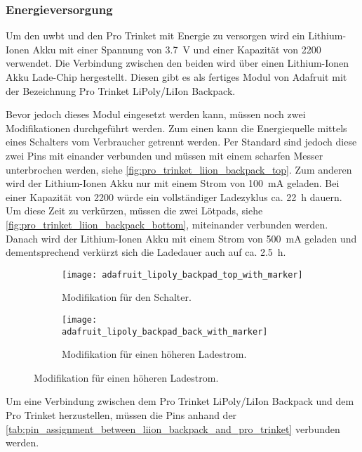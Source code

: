 \subsubsection{Energieversorgung}

Um den \Gls{uwbt} und den Pro Trinket mit Energie zu versorgen wird ein Lithium-Ionen Akku mit einer Spannung von \SI{3.7}{\volt} und einer Kapazität von \SI{2200}{\mAh} verwendet. Die Verbindung zwischen den beiden wird über einen Lithium-Ionen Akku Lade-Chip hergestellt. Diesen gibt es als fertiges Modul von Adafruit mit der Bezeichnung Pro Trinket LiPoly/LiIon Backpack.

Bevor jedoch dieses Modul eingesetzt werden kann, müssen noch zwei Modifikationen durchgeführt werden. Zum einen kann die Energiequelle mittels eines Schalters vom Verbraucher getrennt werden. Per Standard sind jedoch diese zwei Pins mit einander verbunden und müssen mit einem scharfen Messer unterbrochen werden, siehe \autoref{fig:pro_trinket_liion_backpack_top}. Zum anderen wird der Lithium-Ionen Akku nur mit einem Strom von \SI{100}{\mA} geladen. Bei einer Kapazität von \SI{2200}{\mAh} würde ein vollständiger Ladezyklus ca. \SI{22}{\hour} dauern. Um diese Zeit zu verkürzen, müssen die zwei Lötpads, siehe \autoref{fig:pro_trinket_liion_backpack_bottom}, miteinander verbunden werden. Danach wird der Lithium-Ionen Akku mit einem Strom von \SI{500}{\mA} geladen und dementsprechend verkürzt sich die Ladedauer auch auf ca. \SI{2.5}{\hour}.

\begin{figure}
	\centering
	\begin{subfigure}[t]{0.25\linewidth}
		\texttt{[image: adafruit\_lipoly\_backpad\_top\_with\_marker]}
		\caption{Modifikation für den Schalter.}
		\label{fig:pro_trinket_liion_backpack_top}
	\end{subfigure}
	\qquad
	\begin{subfigure}[t]{0.25\linewidth}
		\texttt{[image: adafruit\_lipoly\_backpad\_back\_with\_marker]}
		\caption{Modifikation für einen höheren Ladestrom.}
		\label{fig:pro_trinket_liion_backpack_bottom}
	\end{subfigure}
	\label{fig:pro_trinket_liion_backpack}
\end{figure}

Um eine Verbindung zwischen dem Pro Trinket LiPoly/LiIon Backpack und dem Pro Trinket herzustellen, müssen die Pins anhand der \autoref{tab:pin_assignment_between_liion_backpack_and_pro_trinket} verbunden werden.


